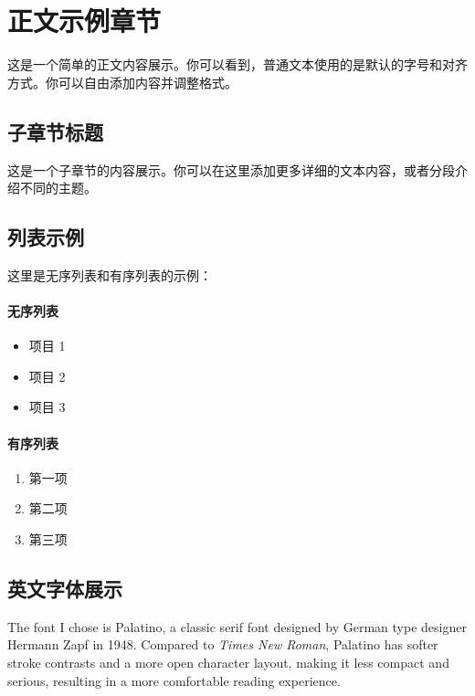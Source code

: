 \section{正文示例章节}

这是一个简单的正文内容展示。你可以看到，普通文本使用的是默认的字号和对齐方式。你可以自由添加内容并调整格式。

\subsection{子章节标题}

这是一个子章节的内容展示。你可以在这里添加更多详细的文本内容，或者分段介绍不同的主题。

\subsection{列表示例}

这里是无序列表和有序列表的示例：

\paragraph{无序列表}
\begin{itemize}
    \item 项目 1
    \item 项目 2
    \item 项目 3
\end{itemize}

\paragraph{有序列表}
\begin{enumerate}
    \item 第一项
    \item 第二项
    \item 第三项
\end{enumerate}

\subsection{英文字体展示}

The font I chose is Palatino, a classic serif font designed by German type designer Hermann Zapf in 1948. 
Compared to \textit{Times New Roman}, Palatino has softer stroke contrasts and a more open character layout, making it less compact and serious, resulting in a more comfortable reading experience.

